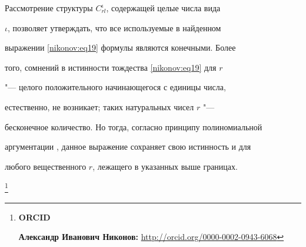 Рассмотрение структуры $C_{rl}^\iota$, содержащей целые числа вида

$\iota$, позволяет утверждать, что все используемые в найденном

выражении \eqref{nikonov:eq19} формулы являются конечными. Более

того, сомнений в истинности тождества \eqref{nikonov:eq19} для $r$

"--- целого положительного начинающегося с единицы числа,

естественно, не возникает; таких натуральных чисел $r$ "---

бесконечное количество. Но тогда, согласно принципу полиномиальной

аргументации \cite{nikonov:bib12}, данное выражение сохраняет свою истинность и для

любого вещественного $r$, лежащего в указанных выше границах.









\thanks{{\bf ORCID}



{\bf Александр Иванович Никонов:} \url{http://orcid.org/0000-0002-0943-6068}



}





\RusRef





